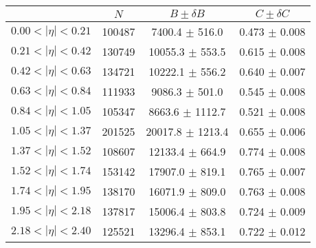 \begin{tabular}{lccc}
\hline
    &   $N$   & $B \pm \delta B$  &  $C \pm \delta C$ \\
\hline
$0.00 < |\eta| <0.21$          & 100487     & 7400.4     $\pm$ 516.0 & 0.473      $\pm$ 0.008 \\
$0.21 < |\eta| <0.42$          & 130749     & 10055.3    $\pm$ 553.5 & 0.615      $\pm$ 0.008 \\
$0.42 < |\eta| <0.63$          & 134721     & 10222.1    $\pm$ 556.2 & 0.640      $\pm$ 0.007 \\
$0.63 < |\eta| <0.84$          & 111933     & 9086.3     $\pm$ 501.0 & 0.545      $\pm$ 0.008 \\
$0.84 < |\eta| <1.05$          & 105347     & 8663.6     $\pm$ 1112.7 & 0.521      $\pm$ 0.008 \\
$1.05 < |\eta| <1.37$          & 201525     & 20017.8    $\pm$ 1213.4 & 0.655      $\pm$ 0.006 \\
$1.37 < |\eta| <1.52$          & 108607     & 12133.4    $\pm$ 664.9 & 0.774      $\pm$ 0.008 \\
$1.52 < |\eta| <1.74$          & 153142     & 17907.0    $\pm$ 819.1 & 0.765      $\pm$ 0.007 \\
$1.74 < |\eta| <1.95$          & 138170     & 16071.9    $\pm$ 809.0 & 0.763      $\pm$ 0.008 \\
$1.95 < |\eta| <2.18$          & 137817     & 15006.4    $\pm$ 803.8 & 0.724      $\pm$ 0.009 \\
$2.18 < |\eta| <2.40$          & 125521     & 13296.4    $\pm$ 853.1 & 0.722      $\pm$ 0.012 \\
\hline
\end{tabular}
